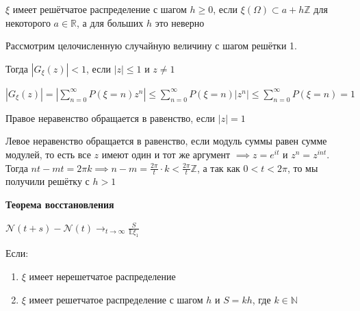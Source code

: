 \begin{definition}
    $\xi$ имеет решётчатое распределение с шагом $h \geqslant 0$, если $\xi (\Omega) \subset a + h\mathbb{Z}$ для некоторого $a \in \mathbb{R}$, а для больших $h$ это неверно

    \begin{remark}
        Рассмотрим целочисленную случайную величину с шагом решётки 1.

        Тогда $ \left| G_{\xi} (z) \right| < 1$, если $|z| \leqslant 1$ и $z \neq 1$

        $\left| G_{\xi} (z) \right| = \left| \sum\limits_{n=0}^\infty P(\xi = n) z^n \right| \leqslant \sum\limits_{n=0}^\infty P(\xi = n) |z^n| \leqslant \sum\limits_{n=0}^\infty P(\xi = n) = 1$

        Правое неравенство обращается в равенство, если $|z| = 1$

        Левое неравенство обращается в равенство, если модуль суммы равен сумме модулей, то есть все $z$ имеют один и тот же аргумент $\implies z = e^{it}$ и $z^n = z^{int}$. Тогда 
        $nt - mt = 2\pi k \implies n - m = \frac{2\pi}{t} \cdot k < \frac{2\pi}{t} \mathbb{Z}$, а так как $0 < t < 2\pi$, то мы получили решётку с $h > 1$
    \end{remark}
\end{definition}

\begin{theorem}
    \textbf{Теорема восстановления}

    $\mathcal{N} (t + s) - \mathcal{N} (t) \rightarrow_{t \to \infty} \frac{S}{\mathbb{E} \xi_1}$

    Если:
    \begin{enumerate}
        \item $\xi$ имеет нерешетчатое распределение
        \item $\xi$ имеет решетчатое распределение с шагом $h$ и $S = kh$, где $k \in \mathbb{N}$ 
    \end{enumerate}
\end{theorem}

